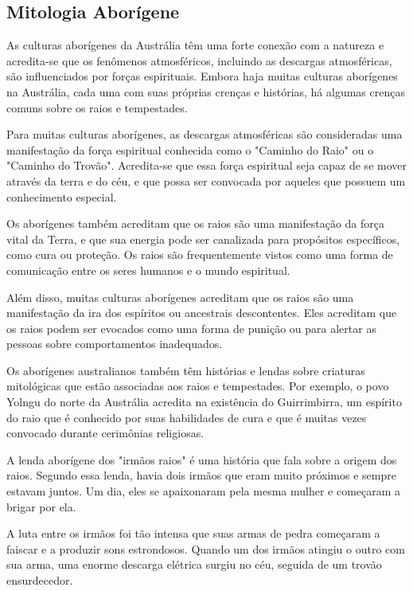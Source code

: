 \documentclass[a4paper, 12pt, onecolumn,singlespacing]{article}
\begin{document}
	\subsection{Mitologia Aborígene}
	
	As culturas aborígenes da Austrália têm uma forte conexão com a natureza e acredita-se que os fenômenos atmosféricos, incluindo as descargas atmosféricas, são influenciados por forças espirituais. Embora haja muitas culturas aborígenes na Austrália, cada uma com suas próprias crenças e histórias, há algumas crenças comuns sobre os raios e tempestades.
	
	Para muitas culturas aborígenes, as descargas atmosféricas são consideradas uma manifestação da força espiritual conhecida como o "Caminho do Raio" ou o "Caminho do Trovão". Acredita-se que essa força espiritual seja capaz de se mover através da terra e do céu, e que possa ser convocada por aqueles que possuem um conhecimento especial.
	
	Os aborígenes também acreditam que os raios são uma manifestação da força vital da Terra, e que sua energia pode ser canalizada para propósitos específicos, como cura ou proteção. Os raios são frequentemente vistos como uma forma de comunicação entre os seres humanos e o mundo espiritual.
	
	Além disso, muitas culturas aborígenes acreditam que os raios são uma manifestação da ira dos espíritos ou ancestrais descontentes. Eles acreditam que os raios podem ser evocados como uma forma de punição ou para alertar as pessoas sobre comportamentos inadequados.
	
	Os aborígenes australianos também têm histórias e lendas sobre criaturas mitológicas que estão associadas aos raios e tempestades. Por exemplo, o povo Yolngu do norte da Austrália acredita na existência do Guirrimbirra, um espírito do raio que é conhecido por suas habilidades de cura e que é muitas vezes convocado durante cerimônias religiosas.
	
	A lenda aborígene dos "irmãos raios" é uma história que fala sobre a origem dos raios. Segundo essa lenda, havia dois irmãos que eram muito próximos e sempre estavam juntos. Um dia, eles se apaixonaram pela mesma mulher e começaram a brigar por ela.
	
	A luta entre os irmãos foi tão intensa que suas armas de pedra começaram a faiscar e a produzir sons estrondosos. Quando um dos irmãos atingiu o outro com sua arma, uma enorme descarga elétrica surgiu no céu, seguida de um trovão ensurdecedor.
	
\end{document}
